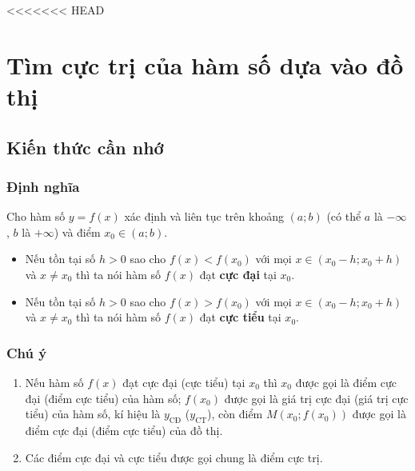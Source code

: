 <<<<<<< HEAD
\setcounter{ex}{0}
\section{Tìm cực trị của hàm số dựa vào đồ thị}
\subsection{Kiến thức cần nhớ}
\begin{khung}
	\subsubsection{Định nghĩa}
Cho hàm số $y=f(x)$ xác định và liên tục trên khoảng $(a;b)$ (có thể $a$ là $-\infty$, $b$ là $+\infty$) và điểm $x_0\in (a;b)$.
\begin{itemize}
\item Nếu tồn tại số $h>0$ sao cho $f(x)<f(x_0)$ với mọi $x\in (x_0-h;x_0+h)$ và $x\neq x_0$ thì ta nói hàm số $f(x)$ đạt {\bf cực đại} tại $x_0$.
\item Nếu tồn tại số $h>0$ sao cho $f(x)>f(x_0)$ với mọi $x\in (x_0-h;x_0+h)$ và $x\neq x_0$ thì ta nói hàm số $f(x)$ đạt {\bf cực tiểu} tại $x_0$.
\end{itemize}
\begin{center}
\end{center}
\subsubsection{Chú ý}
\begin{enumerate}
\item  Nếu hàm số $f(x)$ đạt cực đại (cực tiểu) tại $x_0$ thì $x_0$ được gọi là điểm cực đại (điểm cực tiểu) của hàm số; $f\left(x_0\right)$ được gọi là giá trị cực đại (giá trị cực tiểu) của hàm số, kí hiệu là $y_\text{CĐ}$ ($y_\text{CT}$), còn điểm $M\left(x_0 ; f\left(x_0\right)\right)$ được gọi là điểm cực đại (điểm cực tiểu) của đồ thị.
\item Các điểm cực đại và cực tiểu được gọi chung là điểm cực trị. 
\end{enumerate}
\end{khung}
